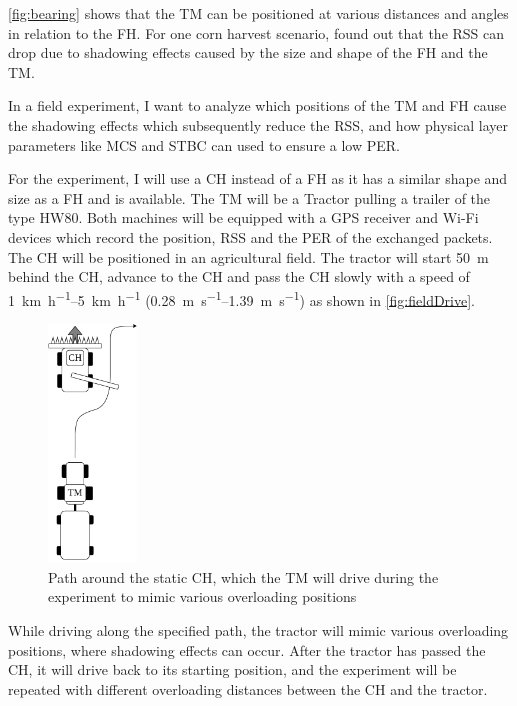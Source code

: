 \autoref{fig:bearing} shows that the \ac{TM} can be positioned at various distances and angles in relation to the \ac{FH}.
For one corn harvest scenario, \textcite{klingler_agriculture_2018} found out that the \ac{RSS} can drop due to
shadowing effects caused by the size and shape of the \ac{FH} and the \ac{TM}.

In a field experiment, I want to analyze which positions of the \ac{TM} and \ac{FH} cause the shadowing effects which
subsequently reduce the \ac{RSS}, and how physical layer parameters like \ac{MCS} and \ac{STBC} can used to ensure a low
\ac{PER}.

For the experiment, I will use a \ac{CH} instead of a \ac{FH} as it has a similar shape and size as a \ac{FH} and is available.
The \ac{TM} will be a Tractor pulling a trailer of the type HW80.
Both machines will be equipped with a \ac{GPS} receiver and Wi-Fi devices which record the position, \ac{RSS} and the \ac{PER} of the
exchanged packets.
The \ac{CH} will be positioned in an agricultural field.
The tractor will start \SI{50}{\metre} behind the \ac{CH}, advance to the \ac{CH} and pass the \ac{CH} slowly with a
speed of \SIrange{1}{5}{\kilo\metre\per\hour} (\SIrange{0.28}{1.39}{\metre\per\second}) as shown in \autoref{fig:fieldDrive}.
\begin{figure}[]%
	\centering
	\includegraphics[width=0.21\textwidth]{figures/FieldExperimentDrive}
	\caption{Path around the static \acf{CH}, which the \acf{TM} will drive during the experiment to mimic various overloading positions}%
	\label{fig:fieldDrive}
\end{figure}

While driving along the specified path, the tractor will mimic various overloading positions, where shadowing effects can occur. After the tractor has passed the \ac{CH},
it will drive back to its starting position, and the experiment will be repeated with different overloading distances between the \ac{CH} and the tractor.


